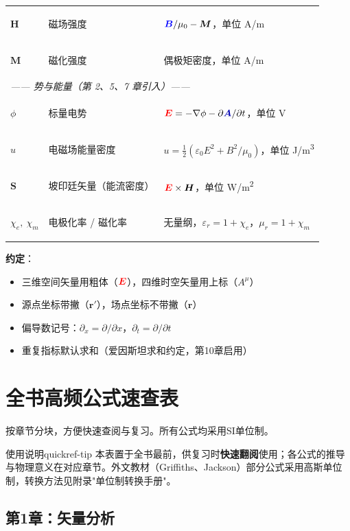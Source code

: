 \documentclass[11pt,a4paper,openany,oneside]{book}
\newcommand{\vecE}{\textcolor{red}{\vect{E}}}
\newcommand{\vecB}{\textcolor{blue}{\vect{B}}}
\newcommand{\vecA}{\textcolor{blue!70!black}{\vect{A}}}
\newcommand{\eps}{\varepsilon}
\newcommand{\vect}[1]{\bm{#1}}
\newcommand{\grad}{\nabla}
\begin{document}
\begin{center}
\begin{tabular}{@{}llp{}@{}}
\hypertarget{symH}{$\vect{H}$} & 磁场强度 & $\vecB/\mu_0 - \vect{M}$，单位 \si{A/m} \\
\hypertarget{symM}{$\vect{M}$} & 磁化强度 & 偶极矩密度，单位 \si{A/m} \\
\midrule
\multicolumn{3}{l}{\textit{—— 势与能量（第 2、5、7 章引入）——}} \\
\hypertarget{symphi}{$\phi$} & 标量电势 & $\vecE = -\grad\phi - \partial\vecA/\partial t$，单位 \si{V} \\
\hypertarget{symu}{$u$} & 电磁场能量密度 & $u = \frac{1}{2}(\eps_0 E^2 + B^2/\mu_0)$，单位 \si{J/m^3} \\
\hypertarget{symS}{$\vect{S}$} & 坡印廷矢量（能流密度） & $\vecE \times \vect{H}$，单位 \si{W/m^2} \\
\hypertarget{symchi}{$\chi_e,\ \chi_m$} & 电极化率 / 磁化率 & 无量纲，$\eps_r = 1+\chi_e$，$\mu_r = 1+\chi_m$ \\
\bottomrule
\end{tabular}
\end{center}

\vspace{1em}
\noindent\textbf{约定}：
\begin{itemize}[nosep]
\item 三维空间矢量用粗体（$\vecE$），四维时空矢量用上标（$A^\mu$）
\item 源点坐标带撇（$\vect{r}'$），场点坐标不带撇（$\vect{r}$）
\item 偏导数记号：$\partial_x = \partial/\partial x$，$\partial_t = \partial/\partial t$
\item 重复指标默认求和（爱因斯坦求和约定，第10章启用）
\end{itemize}

\newpage
\chapter*{全书高频公式速查表}

按章节分块，方便快速查阅与复习。所有公式均采用SI单位制。

\begin{tip}{使用说明}{quickref-tip}
本表置于全书最前，供复习时\textbf{快速翻阅}使用；各公式的推导与物理意义在对应章节。外文教材（Griffiths、Jackson）部分公式采用高斯单位制，转换方法见附录"单位制转换手册"。
\end{tip}

\section{第1章：矢量分析}
\end{document}
